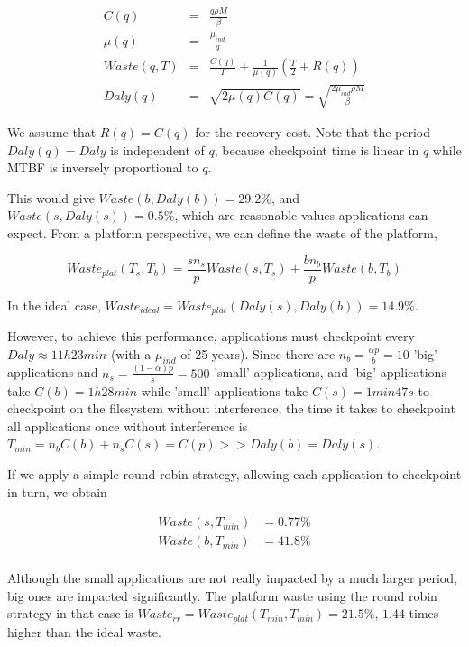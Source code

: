 \documentclass{article}
\begin{document}
\begin{eqnarray}
C(q) &=& \frac{q\rho M}{\beta}\\
\mu(q) &=& \frac{\mu_{ind}}{q}\\
Waste(q, T) &=& \frac{C(q)}{T} + \frac{1}{\mu(q)}\left(\frac{T}{2}+R(q)\right)\\
Daly(q) &=& \sqrt{2\mu(q)C(q)} = \sqrt{\frac{2\mu_{ind}\rho M}{\beta}}
\end{eqnarray}

We assume that $R(q) =C(q)$ for the recovery cost. Note that the period $Daly(q)=Daly$ is independent of
$q$, because checkpoint time is linear in $q$ while MTBF is inversely proportional to $q$.

This would give $Waste(b, Daly(b)) = 29.2\%$, and $Waste(s, Daly(s)) = 0.5\%$, which are reasonable values applications can expect. From a platform perspective, we can define the waste of the platform,

$$Waste_{plat}(T_s, T_b) = \frac{s n_{s}}{p}Waste(s, T_s) + \frac{b n_{b}}{p}Waste(b, T_b)$$

In the ideal case, $Waste_{ideal} = Waste_{plat}(Daly(s), Daly(b)) = 14.9\%$.

However, to achieve this performance, applications must checkpoint every $Daly \approx 11h23min$ (with a $\mu_{ind}$ of 25 years).
Since there are $n_b = \frac{\alpha p}{b} = 10$ 'big' applications and $n_s = \frac{(1-\alpha)p}{s} = 500$ 'small' applications, and 'big' applications take $C(b) = 1h28min$ while 'small' applications take $C(s) = 1min47s$ to checkpoint on the filesystem without interference, the time it takes to checkpoint all applications once without interference is $T_{min} = n_bC(b) + n_sC(s) = C(p) >> Daly(b) = Daly(s)$.

If we apply a simple round-robin strategy, allowing each application to checkpoint in turn, we obtain

$$
\begin{array}{rl}
Waste(s, T_{min}) &= 0.77\%\\
Waste(b, T_{min}) &= 41.8\%\\
\end{array}
$$

Although the small applications are not really impacted by a much larger period, big ones are impacted significantly. The platform waste using the round robin strategy in that case is $Waste_{rr} = Waste_{plat}(T_{min}, T_{min}) = 21.5\%$, $1.44$ times higher than the ideal waste.
\end{document}

